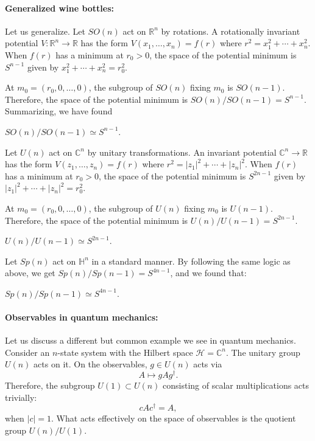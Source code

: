 \documentclass[12pt]{article}
\numberwithin{equation}{section}
\theoremstyle{remark}
\def\bC{\mathbb{C}}
\def\bH{\mathbb{H}}
\def\bR{\mathbb{R}}
\def\cH{\mathcal{H}}
\begin{document}
\paragraph{Generalized wine bottles:}
Let us generalize.
Let $SO(n)$ act on $\bR^n$ by rotations.
A rotationally invariant potential $V:\bR^n\to \bR$ 
has the form $V(x_1,\ldots,x_n)=f(r)$ where $r^2={x_1^2+\cdots+x_n^2}$.
When $f(r)$ has a minimum at $r_0>0$,
the space of the potential minimum is $S^{n-1}$ given by $x_1^2+\cdots + x_n^2=r_0^2$.

At $m_0=(r_0,0,\ldots,0)$, the subgroup of $SO(n)$ fixing $m_0$ is $SO(n-1)$.
Therefore, the space of the potential minimum is $SO(n)/SO(n-1)=S^{n-1}$.
Summarizing, we have found
\begin{proposition}
  \label{prop:SO/SO}
 $ SO(n)/SO(n-1) \simeq S^{n-1}$.
\end{proposition}

Let $U(n)$ act on $\bC^n$ by unitary transformations.
An invariant potential $\bC^n\to \bR$ has the form $V(z_1,\ldots,z_n)=f(r)$
where $r^2=|z_1|^2+\cdots+|z_n|^2$.
When $f(r)$ has a minimum at $r_0>0$,
the space of the potential minimum is $S^{2n-1}$ given by $|z_1|^2+\cdots + |z_n|^2=r_0^2$.

At $m_0=(r_0,0,\ldots,0)$, the subgroup of $U(n)$ fixing $m_0$ is $U(n-1)$.
Therefore, the space of the potential minimum is $U(n)/U(n-1)=S^{2n-1}$.
\begin{proposition}
  \label{prop:U/U}
$U(n)/U(n-1)\simeq S^{2n-1}$.
\end{proposition}

Let $Sp(n)$ act on $\bH^n$ in a standard manner.
By following the same logic as above, we get $Sp(n)/Sp(n-1)=S^{4n-1}$,
and we found that:
\begin{proposition}
  \label{prop:Sp/Sp}
$ Sp(n)/Sp(n-1)\simeq S^{4n-1}$.
\end{proposition}

\paragraph{Observables in quantum mechanics:}
Let us discuss a different but common example we see in quantum mechanics.
Consider an $n$-state system with the Hilbert space $\cH=\bC^n$.
The unitary group $U(n)$ acts on it.
On the observables, $g\in U(n)$ acts via \begin{equation}
  A\mapsto g A g^\dagger.
\end{equation}
Therefore, the subgroup $U(1) \subset U(n)$
consisting of scalar multiplications acts trivially: \begin{equation}
c A c^\dagger = A,
\end{equation} when $|c|=1$. 
What acts effectively on the space of observables is the quotient group $U(n)/U(1)$.
\end{document}
